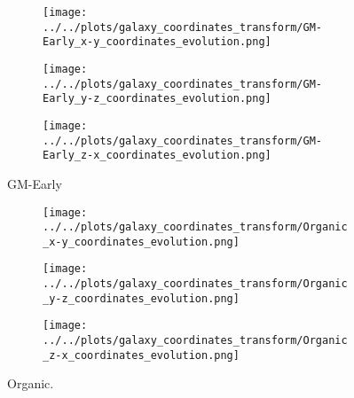 \documentclass{article}
\begin{document}
	\begin{figure}
		\centering
		\begin{subfigure} {.325\columnwidth}
				\centering 
				\texttt{[image: ../../plots/galaxy\_coordinates\_transform/GM-Early\_x-y\_coordinates\_evolution.png]}
		\end{subfigure}
			\hfill
		\begin{subfigure} {.325\columnwidth}
				\centering 
				\texttt{[image: ../../plots/galaxy\_coordinates\_transform/GM-Early\_y-z\_coordinates\_evolution.png]}
		\end{subfigure}
			\hfill
		\begin{subfigure} {.325\columnwidth}
				\centering 
				\texttt{[image: ../../plots/galaxy\_coordinates\_transform/GM-Early\_z-x\_coordinates\_evolution.png]}
		\end{subfigure}
		
		\caption{GM-Early}
	\end{figure}

	\clearpage

	\begin{figure}
		\centering
		\begin{subfigure} {.325\columnwidth}
				\centering 
				\texttt{[image: ../../plots/galaxy\_coordinates\_transform/Organic\_x-y\_coordinates\_evolution.png]}
		\end{subfigure}
			\hfill
		\begin{subfigure} {.325\columnwidth}
				\centering 
				\texttt{[image: ../../plots/galaxy\_coordinates\_transform/Organic\_y-z\_coordinates\_evolution.png]}
		\end{subfigure}
			\hfill
		\begin{subfigure} {.325\columnwidth}
				\centering 
				\texttt{[image: ../../plots/galaxy\_coordinates\_transform/Organic\_z-x\_coordinates\_evolution.png]}
		\end{subfigure}
		
		\caption{Organic.}
	\end{figure}

	\clearpage
\end{document}
